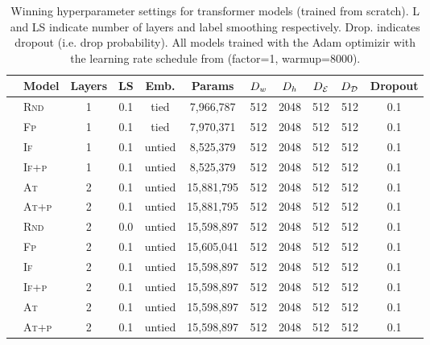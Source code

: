 \begin{table}
\center
\begin{tabular}{cl cccc ccccc}
\toprule
&Model & Layers & LS & Emb. & Params & $D_{w}$ & $D_{h}$ & ${D_\mathcal{E}}$ & ${D_\mathcal{D}}$ & Dropout\\
\midrule
    \parbox[t]{2mm}{} 
 & \textsc{Rnd} & 1 & 0.1 & tied & 7,966,787 & 512 & 2048 & 512 & 512 & 0.1\\
 & \textsc{Fp} & 1 & 0.1 & tied & 7,970,371 & 512 & 2048 & 512 & 512 & 0.1\\
 & \textsc{If} & 1 & 0.1 & untied & 8,525,379 & 512 & 2048 & 512 & 512 & 0.1 \\
 & \textsc{If+p} & 1 & 0.1 & untied & 8,525,379 & 512 & 2048 & 512 & 512 & 0.1 \\
 & \textsc{At} & 2 & 0.1 & untied & 15,881,795 & 512 & 2048 & 512 & 512 & 0.1 \\
 & \textsc{At+p} & 2 & 0.1 & untied & 15,881,795 & 512 & 2048 & 512 & 512 & 0.1 \\
\midrule
    \parbox[t]{2mm}{} 
 & \textsc{Rnd} & 2 & 0.0 & untied & 15,598,897 & 512 & 2048 & 512 & 512 & 0.1\\
 & \textsc{Fp} & 2 & 0.1 & untied & 15,605,041 & 512 & 2048 & 512 & 512 & 0.1\\
 & \textsc{If} & 2 & 0.1 & untied & 15,598,897 & 512 & 2048 & 512 & 512 & 0.1 \\
 & \textsc{If+p} & 2 & 0.1 & untied & 15,598,897 & 512 & 2048 & 512 & 512 & 0.1\\
 & \textsc{At} & 2 & 0.1 & untied & 15,598,897 & 512 & 2048 & 512 & 512 & 0.1 \\
 & \textsc{At+p} & 2 & 0.1 & untied & 15,598,897 & 512 & 2048 & 512 & 512 & 0.1 \\
\bottomrule
\end{tabular}

\caption{Winning hyperparameter settings for transformer models 
(trained from scratch). L and  LS indicate number of layers and label smoothing respectively. Drop. indicates dropout (i.e. drop probability).
All models trained with the Adam optimizir with the learning
            rate schedule from \cite{rush2018} (factor=1, warmup=8000).
}
\label{tab:tfparams}
\end{table}

